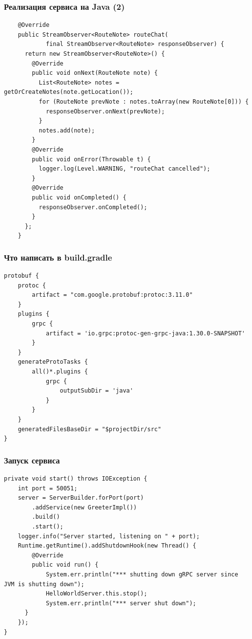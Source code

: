 \documentclass[xetex,mathserif,serif]{beamer}
\begin{document}
    \begin{frame}[fragile]
        \frametitle{Реализация сервиса на Java (2)}
        \begin{scriptsize}
            \begin{verbatim}
    @Override
    public StreamObserver<RouteNote> routeChat(
            final StreamObserver<RouteNote> responseObserver) {
      return new StreamObserver<RouteNote>() {
        @Override
        public void onNext(RouteNote note) {
          List<RouteNote> notes = getOrCreateNotes(note.getLocation());
          for (RouteNote prevNote : notes.toArray(new RouteNote[0])) {
            responseObserver.onNext(prevNote);
          }
          notes.add(note);
        }
        @Override
        public void onError(Throwable t) {
          logger.log(Level.WARNING, "routeChat cancelled");
        }
        @Override
        public void onCompleted() {
          responseObserver.onCompleted();
        }
      };
    }
            \end{verbatim}
        \end{scriptsize}
    \end{frame}

    \begin{frame}[fragile]
        \frametitle{Что написать в build.gradle}
        \begin{small}
            \begin{verbatim}
protobuf {
    protoc {
        artifact = "com.google.protobuf:protoc:3.11.0"
    }
    plugins {
        grpc {
            artifact = 'io.grpc:protoc-gen-grpc-java:1.30.0-SNAPSHOT'
        }
    }
    generateProtoTasks {
        all()*.plugins {
            grpc {
                outputSubDir = 'java'
            }
        }
    }
    generatedFilesBaseDir = "$projectDir/src"
}
            \end{verbatim}
        \end{small}
    \end{frame}

    \begin{frame}[fragile]
        \frametitle{Запуск сервиса}
        \begin{footnotesize}
            \begin{verbatim}
private void start() throws IOException {
    int port = 50051;
    server = ServerBuilder.forPort(port)
        .addService(new GreeterImpl())
        .build()
        .start();
    logger.info("Server started, listening on " + port);
    Runtime.getRuntime().addShutdownHook(new Thread() {
        @Override
        public void run() {
            System.err.println("*** shutting down gRPC server since JVM is shutting down");
            HelloWorldServer.this.stop();
            System.err.println("*** server shut down");
      }
    });
}
            \end{verbatim}
        \end{footnotesize}
    \end{frame}
\end{document}
